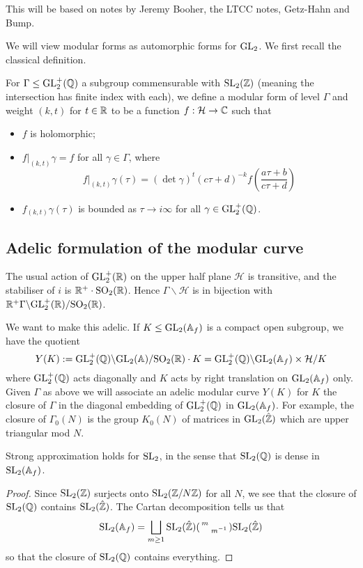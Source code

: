 This will be based on notes by Jeremy Booher, the LTCC notes, Getz-Hahn and Bump.

We will view modular forms as automorphic forms for $\mathrm{GL}_2$. We first recall the classical definition.

\begin{defn}
    For $\Gamma \leq \mathrm{GL}_2^+ (\mathbb{Q})$ a subgroup commensurable with $\mathrm{SL}_2 (\mathbb{Z})$ (meaning the intersection has finite index with each), we define a modular form of level $\Gamma$ and weight $(k,t)$ for $t \in \mathbb{R}$ to be a function $f: \mathcal H \to \mathbb{C}$ such that
    \begin{itemize}
        \item $f$ is holomorphic;
        \item $f|_{(k,t)} \gamma = f$ for all $\gamma \in \Gamma$, where $$f|_{(k,t)} \gamma(\tau) = (\det \gamma)^t (c\tau+d)^{-k} f\left(\frac{a\tau+b }{c\tau +d}\right)$$
        \item $f_{(k,t)}\gamma(\tau)$ is bounded as $\tau \to i\infty$ for all $\gamma \in \mathrm{GL}_2^+ (\mathbb{Q})$.
    \end{itemize}
\end{defn}

\subsection{Adelic formulation of the modular curve}

The usual action of $\mathrm{GL}_2^+ (\mathbb{R})$ on the upper half plane $\mathcal H$ is transitive, and the stabiliser of $i$ is $\mathbb{R}^+ \cdot \mathrm{SO}_2(\mathbb{R})$. Hence $\Gamma \backslash \mathcal H$ is in bijection with $\mathbb{R}^+ \Gamma \backslash \mathrm{GL}_2^+ (\mathbb{R}) / \mathrm{SO}_2 (\mathbb{R})$.

We want to make this adelic. If $K \leq \mathrm{GL}_2(\mathbb{A}_f)$ is a compact open subgroup, we have the quotient
$$Y(K):= \mathrm{GL}_2^+(\mathbb{Q}) \backslash \mathrm{GL}_2(\mathbb{A})/ \mathrm{SO}_2(\mathbb{R})\cdot K = \mathrm{GL}_2^+ (\mathbb{Q}) \backslash \mathrm{GL}_2(\mathbb{A}_f) \times \mathcal H/ K$$ where $\mathrm{GL}_2^+(\mathbb{Q})$ acts diagonally and $K$ acts by right translation on $\mathrm{GL}_2(\mathbb{A}_f)$ only. Given $\Gamma$ as above we will associate an adelic modular curve $Y(K)$ for $K$ the closure of $\Gamma$ in the diagonal embedding of $\mathrm{GL}_2^+ (\mathbb{Q})$ in $\mathrm{GL}_2 (\mathbb{A}_f)$. For example, the closure of $\Gamma_0(N)$ is the group $K_0(N)$ of matrices in $\mathrm{GL}_2(\hat{\mathbb{Z}})$ which are upper triangular mod $N$.

\begin{thm}
    Strong approximation holds for $\mathrm{SL}_2$, in the sense that $\mathrm{SL}_2(\mathbb{Q})$ is dense in $\mathrm{SL}_2(\mathbb{A}_f)$.
\end{thm}
\begin{proof}
    Since $\mathrm{SL}_2(\mathbb{Z})$ surjects onto $\mathrm{SL}_2(\mathbb{Z}/N\mathbb{Z})$ for all $N$, we see that the closure of $\mathrm{SL}_2(\mathbb{Q})$ contains $\mathrm{SL}_2(\hat{\mathbb{Z}})$. The Cartan decomposition tells us that
    $$\mathrm{SL}_2(\mathbb{A}_f) = \bigsqcup\limits_{m\geq 1} \mathrm{SL}_2(\hat{\mathbb{Z}})\begin{psmallmatrix}
        m& \\ & m^{-1}
    \end{psmallmatrix} \mathrm{SL}_2(\hat{\mathbb{Z}})$$ so that the closure of $\mathrm{SL}_2(\mathbb{Q})$ contains everything.
\end{proof}


